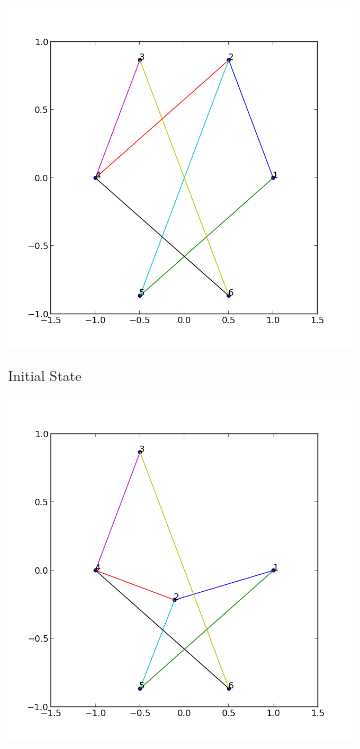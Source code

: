 \documentclass[12pt,a4paper]{article}
\begin{document}
\begin{figure}
			\begin{subfigure}{.5\textwidth}
			\centering
			\includegraphics[scale=0.45]{results_Kawai/ex1p0}\\
			\caption{Initial State}
			\end{subfigure}\hfill
			\begin{subfigure}{.5\textwidth}
			\centering
			\includegraphics[scale=0.45]{results_Kawai/ex1p1}\\

\end{subfigure}
\end{figure}
\end{document}

